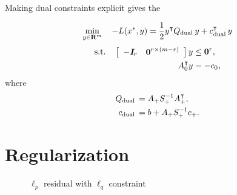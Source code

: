 \documentclass{article}
\begin{document}
    Making dual constraints explicit gives the \QP

    \begin{align*}
        \min_{y\in\textbf{R}^m}\quad -L(x^*,y)=\frac{1}{2} y^\intercal Q_{\text{dual}\:} y + c_{\text{dual}\:}^\intercal y 
    \end{align*}
    \begin{align*}
        \text{s.t.}\quad  \left[\begin{array}{lllllllllllllllllll}-\emph{\textbf{I}}_{r}&\textbf{0}^{{r}\times (m-{r})}\end{array}\right]y&\leq \textbf{0}^{r},\\
        A_0^\intercal y&=-c_0,
    \end{align*}
    where
    \begin{align*}
        Q_{\text{dual}\:}&=A_+ S_+^{-1} A_+^\intercal,\\
        c_{\text{dual}\:}&=b+A_+ S_+^{-1} c_+.
    \end{align*}

\clearpage

\section{Regularization}

    \begin{figure}[h!]
        \centering
        \qquad
        \qquad
        \caption{$\ell_p$ residual with $\ell_q$ constraint}%
        \label{fig:lasso}%
    \end{figure}
\end{document}

